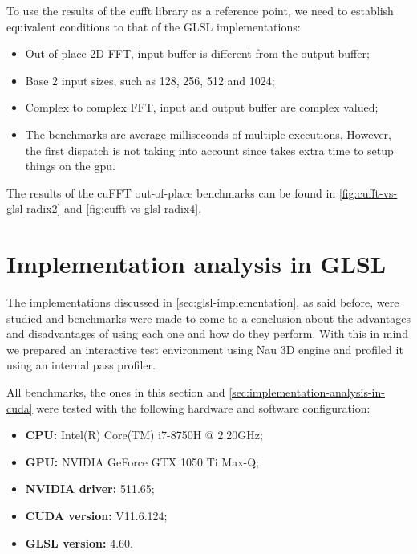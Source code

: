 \documentclass[
  oneside,
  11pt, a4paper,
  footinclude=true,
  headinclude=true,
  cleardoublepage=empty
]{scrbook}
\begin{document}
To use the results of the \acrshort{cufft} library as a reference point, we need to establish equivalent conditions to that of the GLSL implementations:

\begin{itemize}
    \item Out-of-place 2D FFT, input buffer is different from the output buffer;
    \item Base 2 input sizes, such as 128, 256, 512 and 1024;
    \item Complex to complex FFT, input and output buffer are complex valued;
    \item The benchmarks are average milliseconds of multiple executions, However, the first dispatch is not taking into account since  takes extra time to setup things on the \acrshort{gpu}.
\end{itemize}

The results of the cuFFT out-of-place benchmarks can be found in \autoref{fig:cufft-vs-glsl-radix2} and \autoref{fig:cufft-vs-glsl-radix4}.

\section{Implementation analysis in GLSL} \label{sec:implementation-analysis-in-glsl}

The implementations discussed in \autoref{sec:glsl-implementation}, as said before, were studied and benchmarks were made to come to a conclusion about the advantages and disadvantages of using each one and how do they perform. With this in mind we prepared an interactive test environment using Nau 3D engine \cite{nau3d} and profiled it using an internal pass profiler.

All benchmarks, the ones in this section and \autoref{sec:implementation-analysis-in-cuda} were tested with the following hardware and software configuration:

\begin{itemize} \label{itm:benchmark-conditions}
    \item \textbf{CPU:} Intel(R) Core(TM) i7-8750H @ 2.20GHz;
    \item \textbf{GPU:} NVIDIA GeForce GTX 1050 Ti Max-Q;
    \item \textbf{NVIDIA driver:} 511.65;
    \item \textbf{CUDA version:}  V11.6.124;
    \item \textbf{GLSL version:}  4.60.
\end{itemize}
\end{document}
